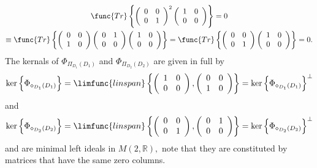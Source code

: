 \documentclass[aps,preprint]{revtex4}
\begin{document}
\begin{gather}
\func{Tr}\left\{ \left( 
\begin{array}{cc}
0 & 0 \\ 
0 & 1%
\end{array}%
\right) ^{2}\left( 
\begin{array}{cc}
1 & 0 \\ 
0 & 0%
\end{array}%
\right) \right\} =0 \\
\equiv \func{Tr}\left\{ \left( 
\begin{array}{cc}
0 & 0 \\ 
1 & 0%
\end{array}%
\right) \left( 
\begin{array}{cc}
0 & 1 \\ 
0 & 0%
\end{array}%
\right) \left( 
\begin{array}{cc}
1 & 0 \\ 
0 & 0%
\end{array}%
\right) \right\} =\func{Tr}\left\{ \left( 
\begin{array}{cc}
0 & 0 \\ 
0 & 1%
\end{array}%
\right) \left( 
\begin{array}{cc}
1 & 0 \\ 
0 & 0%
\end{array}%
\right) \right\} =0.
\end{gather}%
The kernals of $\Phi _{\mathcal{\Pi }_{D_{1}}\left( D_{1}\right) }$ and $%
\Phi _{\mathcal{\Pi }_{D_{2}}\left( D_{2}\right) }$ are given in full by 
\begin{equation}
\ker \left\{ \Phi _{\mathcal{\Pi }_{D_{1}}\left( D_{1}\right) }\right\} =%
\limfunc{linspan}\left\{ \left( 
\begin{array}{cc}
1 & 0 \\ 
0 & 0%
\end{array}%
\right) ,\left( 
\begin{array}{cc}
0 & 0 \\ 
1 & 0%
\end{array}%
\right) \right\} =\ker \left\{ \Phi _{\mathcal{\Pi }_{D_{1}}\left(
D_{1}\right) }\right\} ^{\bot }
\end{equation}%
and 
\begin{equation}
\ker \left\{ \Phi _{\mathcal{\Pi }_{D_{2}}\left( D_{2}\right) }\right\} =%
\limfunc{linspan}\left\{ \left( 
\begin{array}{cc}
0 & 0 \\ 
0 & 1%
\end{array}%
\right) ,\left( 
\begin{array}{cc}
0 & 1 \\ 
0 & 0%
\end{array}%
\right) \right\} =\ker \left\{ \Phi _{\mathcal{\Pi }_{D_{2}}\left(
D_{2}\right) }\right\} ^{\bot }
\end{equation}%
and are minimal left ideals in $M\left( 2,\mathbb{R}\right) ,$ note that
they are constituted by matrices that have the same zero columns.
\end{document}
